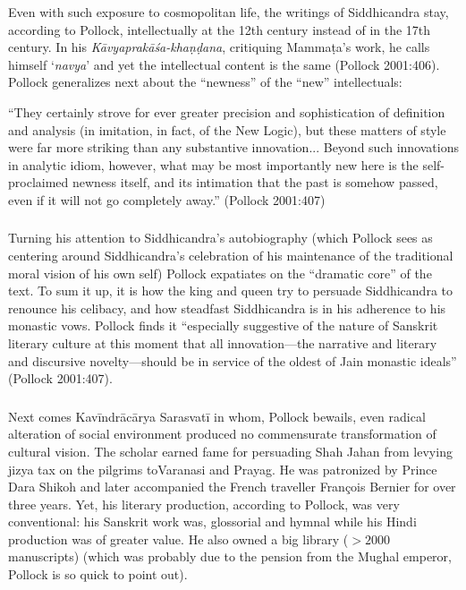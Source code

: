 Even with such exposure to cosmopolitan life, the writings of Siddhicandra stay, according to Pollock, intellectually at the 12th century instead of in the 17th century. In his {\sl Kāvyaprakāśa-khaṇḍana}, critiquing Mammaṭa’s work, he calls himself ‘{\sl navya}’ and yet the intellectual content is the same (Pollock 2001:406). Pollock generalizes next about the “newness” of the “new” intellectuals:
\begin{myquote}
\eleven
“They certainly strove for ever greater precision and sophistication of definition and analysis (in imitation, in fact, of the New Logic), but these matters of style were far more striking than any substantive innovation... Beyond such innovations in analytic idiom, however, what may be most importantly new here is the self-proclaimed newness itself, and its intimation that the past is somehow passed, even if it will not go completely away.” \hfill(Pollock 2001:407)
\end{myquote}

\subsubsection{} Turning his attention to Siddhicandra’s autobiography (which Pollock sees as centering around Siddhicandra’s celebration of his maintenance of the traditional moral vision of his own self) Pollock expatiates on the “dramatic core” of the text. To sum it up, it is how the king and queen try to persuade Siddhicandra to renounce his celibacy, and how steadfast Siddhicandra is in his adherence to his monastic vows. Pollock finds it “especially suggestive of the nature of Sanskrit literary culture at this moment that all innovation—the narrative and literary and discursive novelty—should be in service of the oldest of Jain monastic ideals” (Pollock 2001:407).

\subsubsection{} Next comes Kavīndrācārya Sarasvatī in whom, Pollock bewails, even radical alteration of social environment produced no commensurate transformation of cultural vision. The scholar earned fame for persuading Shah Jahan from levying jizya tax on the pilgrims to\break Varanasi and Prayag. He was patronized by Prince Dara Shikoh and later accompanied the French traveller François Bernier for over three years. Yet, his literary production, according to Pollock, was very conventional: his Sanskrit work was, glossorial and hymnal while his Hindi production was of greater value. He also owned a big library 
($>2000$ manuscripts) (which was probably due to the pension from the Mughal emperor, Pollock is so quick to point out).

